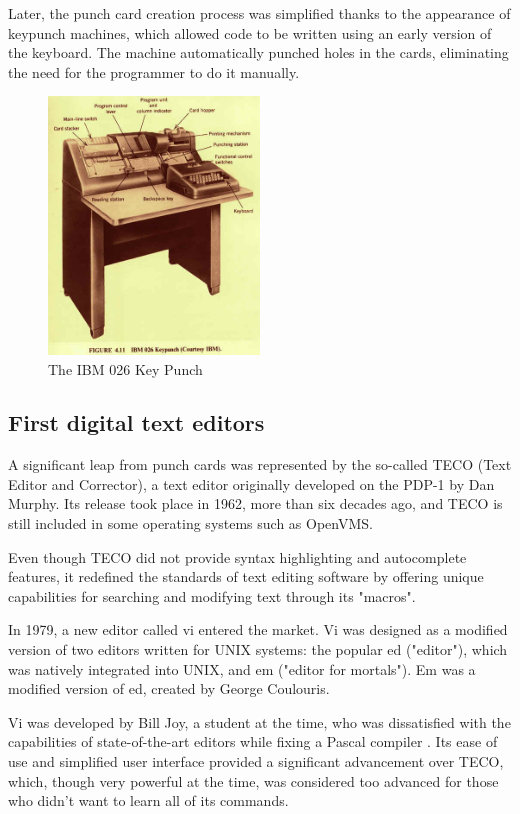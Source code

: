 Later, the punch card creation process was simplified thanks to the appearance of keypunch machines, which allowed code to be written using an early version of the keyboard. The machine automatically punched holes in the cards, eliminating the need for the programmer to do it manually.

\begin{figure}[h]
\centering
\includegraphics[width=0.5\textwidth]{images/keypunch.jpg}
\caption{The IBM 026 Key Punch}
\label{fig:fig2,1.}
\end{figure}

\subsection{First digital text editors}

A significant leap from punch cards was represented by the so-called TECO (Text Editor and Corrector), a text editor originally developed on the PDP-1 by Dan Murphy. Its release took place in 1962, more than six decades ago, and TECO is still included in some operating systems such as OpenVMS.

Even though TECO did not provide syntax highlighting and autocomplete features, it redefined the standards of text editing software by offering unique capabilities for searching and modifying text through its "macros".

In 1979, a new editor called vi entered the market. Vi was designed as a modified version of two editors written for UNIX systems: the popular ed ("editor"), which was natively integrated into UNIX, and em ("editor for mortals"). Em was a modified version of ed, created by George Coulouris.

Vi was developed by Bill Joy, a student at the time, who was dissatisfied with the capabilities of state-of-the-art editors while fixing a Pascal compiler \cite{vi}. Its ease of use and simplified user interface provided a significant advancement over TECO, which, though very powerful at the time, was considered too advanced for those who didn't want to learn all of its commands.

